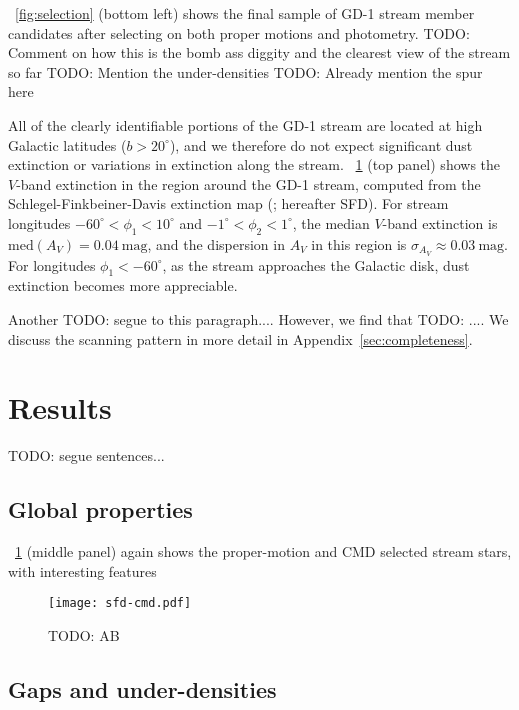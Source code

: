 \documentclass[modern]{aastex62}
\newcommand{\mag}{\textrm{mag}}
\newcommand{\todo}[1]{{\color{red} TODO: #1}}
\begin{document}
\figurename~\ref{fig:selection} (bottom left) shows the final sample of GD-1
stream member candidates after selecting on both proper motions and photometry.
\todo{Comment on how this is the bomb ass diggity and the clearest view of the
stream so far}
\todo{Mention the under-densities}
\todo{Already mention the spur here}

All of the clearly identifiable portions of the GD-1 stream are located at high
Galactic latitudes ($b > 20^\circ$), and we therefore do not expect significant
dust extinction or variations in extinction along the stream.
\figurename~\ref{fig:sfd-cmd} (top panel) shows the $V$-band extinction in the
region around the GD-1 stream, computed from the Schlegel-Finkbeiner-Davis
extinction map (\cite{Schlegel:1998}; hereafter SFD).
For stream longitudes $-60^\circ < \phi_1 < 10^\circ$ and $-1^\circ < \phi_2 <
1^\circ$, the median $V$-band extinction is $\textrm{med}\left(A_V\right) =
0.04~\mag$, and the dispersion in $A_V$ in this region is $\sigma_{A_V} \approx
0.03~\textrm{mag}$.
For longitudes $\phi_1 < -60^\circ$, as the stream approaches the Galactic disk,
dust extinction becomes more appreciable.

Another \todo{segue to this paragraph...}.
However, we find that \todo{...}.
We discuss the scanning pattern in more detail in
Appendix~\ref{sec:completeness}.


\section{Results}
\label{sec:results}

\todo{segue sentences...}

\subsection{Global properties}
\label{sec:res_global}

\figurename~\ref{fig:sfd-cmd} (middle panel) again shows the proper-motion and CMD selected stream stars, with interesting features

\begin{figure}[h]
\begin{center}
\texttt{[image: sfd-cmd.pdf]}
\end{center}
\caption{%
\todo{AB}
\label{fig:sfd-cmd}
}
\end{figure}


\subsection{Gaps and under-densities}
\label{sec:res_gap}
\end{document}

